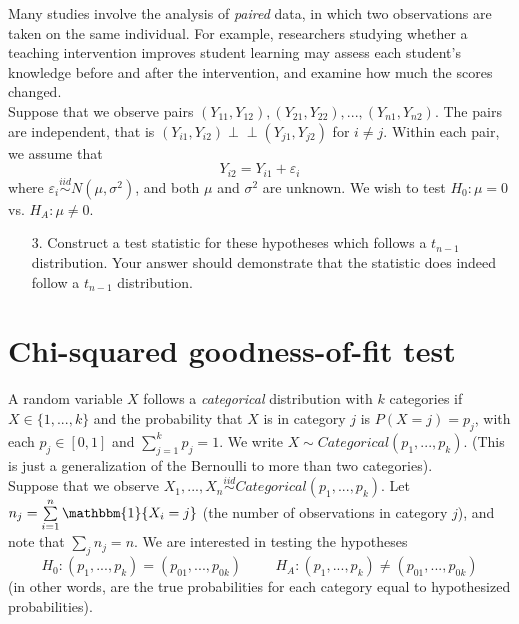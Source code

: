 \documentclass[11pt]{article}
\newcommand{\indep}{\perp \!\!\! \perp}
\begin{document}
Many studies involve the analysis of \textit{paired} data, in which two observations are taken on the same individual. For example, researchers studying whether a teaching intervention improves student learning may assess each student's knowledge before and after the intervention, and examine how much the scores changed.\\

\noindent Suppose that we observe pairs $(Y_{11}, Y_{12}), (Y_{21}, Y_{22}),...,(Y_{n1}, Y_{n2})$. The pairs are independent, that is $(Y_{i1}, Y_{i2}) \indep (Y_{j1}, Y_{j2})$ for $i \neq j$. Within each pair, we assume that
$$Y_{i2} = Y_{i1} + \varepsilon_i$$
where $\varepsilon_i \overset{iid}{\sim} N(\mu, \sigma^2)$, and both $\mu$ and $\sigma^2$ are unknown. We wish to test $H_0: \mu = 0$ vs. $H_A: \mu \neq 0$.

\begin{enumerate}
\item[3.] Construct a test statistic for these hypotheses which follows a $t_{n-1}$ distribution. Your answer should demonstrate that the statistic does indeed follow a $t_{n-1}$ distribution.
\end{enumerate}

\section*{Chi-squared goodness-of-fit test}

A random variable $X$ follows a \textit{categorical} distribution with $k$ categories if $X \in \{1,...,k\}$ and the probability that $X$ is in category $j$ is $P(X = j) = p_j$, with each $p_j \in [0,1]$ and $\sum \limits_{j=1}^k p_j = 1$. We write $X \sim Categorical(p_1,...,p_k)$. (This is just a generalization of the Bernoulli to more than two categories).\\

\noindent Suppose that we observe $X_1,...,X_n \overset{iid}{\sim} Categorical(p_1,...,p_k)$. Let $n_j = \sum \limits_{i=1}^n  \mathbbm{1}\{X_i = j\}$ (the number of observations in category $j$), and note that $\sum_j n_j = n$. We are interested in testing the hypotheses
$$H_0: (p_1,...,p_k) = (p_{01},...,p_{0k}) \hspace{1cm} H_A: (p_1,...,p_k) \neq (p_{01},...,p_{0k})$$
(in other words, are the true probabilities for each category equal to hypothesized probabilities).\\
\end{document}
